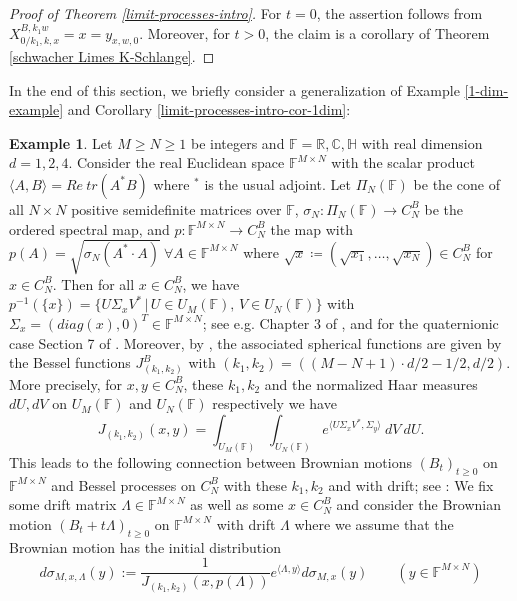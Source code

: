 \documentclass[reqno]{amsart}
\theoremstyle{plain}
\theoremstyle{definition}
\newtheorem{example}[theorem]{Example}
\numberwithin{equation}{section}
\newcommand{\F}{\mathbb{F}}
\begin{document}
\begin{proof}[Proof of Theorem \ref{limit-processes-intro}]
For $t=0$, the assertion follows from $X_{0/k_1,k,x}^{B,k_1w}=x=y_{x,w,0}$.
Moreover, for $t>0$, the claim is a corollary of Theorem \ref{schwacher Limes K-Schlange}.
\end{proof}



In the end of this section, we briefly consider
a generalization of Example \ref{1-dim-example} and Corollary \ref{limit-processes-intro-cor-1dim}:

\begin{example} 
\label{N-dim-example}
Let $M \geq N \geq 1$ be integers and $\mathbb F=\mathbb R,\mathbb C,\mathbb H$ with real dimension $d=1,2,4$.
Consider the  real Euclidean space $\mathbb F^{M \times N}$  with the scalar product $\langle A, B \rangle = Re \> tr(A^*B)$
where $^* $ is the usual adjoint.
Let $\Pi_N(\mathbb F)$ be the cone of all $N \times N$ positive semidefinite matrices over $\F$,
$\sigma_N : \Pi_N(\F) \to C_N^B$ be the ordered spectral map,
and $p:\F^{M \times N} \to C_N^B$ the  map with $p(A)=\sqrt{\sigma_N(A^* \cdot A)} \> \forall A \in \F^{M \times N}$ 
where  $\sqrt{x} \coloneqq (\sqrt{x_1},\ldots,\sqrt{x_N})\in C_N^B$ for  $x \in C_N^B$.
Then for all $x \in C_N^B$, we have
$p^{-1}(\{x\}) = \{U \Sigma_x V^* \, | \, U \in U_M(\F), \, V \in U_N(\F)\}$ 
with $\Sigma_x=(diag(x),0)^T \in \F^{M \times N}$; see  e.g. Chapter 3 of \cite{HJ}, and for the quaternionic case  Section 7 of \cite{Z}.
Moreover, by \cite{R4}, the associated spherical functions are given by the Bessel functions $J_{(k_1,k_2)}^B$
with $(k_1,k_2)=((M-N+1) \cdot d/2 - 1/2, d/2)$. More precisely, for $x,y\in C_N^B$, these $k_1,k_2$ and the normalized Haar measures $dU, dV$ on 
$U_M(\F)$ and $ U_N(\F)$ respectively we have
\begin{equation}\label{spherical-matrix}
J_{(k_1,k_2)}(x,y)= \int_{ U_M(\F)}\int_{ U_N(\F)}  e^{ \langle U \Sigma_x V^*,\Sigma_y  \rangle}   \>  dV \> dU.
\end{equation}
This leads to the following connection between Brownian motions $(B_t)_{t\ge0}$ on $\F^{M \times N}$ and Bessel processes
on $C_N^B$ with these  $k_1,k_2$ and with drift; see \cite{AuV, V2}:
We  fix some drift matrix $\Lambda \in \F^{M \times N}$ as well as some $x\in C_N^B$ and consider the
Brownian motion $(B_t+t\Lambda)_{t\ge0}$ on $\F^{M \times N}$ with  drift  $\Lambda$ where we assume that
the Brownian motion has the initial distribution
$$ d\sigma_{M,x,\Lambda} (y) :=\frac{1}{J_{(k_1,k_2)}(x,p(\Lambda))} e^{\langle \Lambda,y  \rangle}  d\sigma_{M,x} (y) \quad\quad (y\in \F^{M \times N})$$

\end{example}
\end{document}
